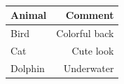\documentclass[11pt, a4paper]{article}
\begin{document}
\begin{example}
\begin{gridlayout}{\textwidth}{11cm}
\begin{row}{0.3}
\begin{cell}{0.3}
            \end{cell}
            \begin{cell}{0.05}
                ~
            \end{cell}
            \begin{cell}{0.3}
                \centering
                \vspace{1em}
                \begin{tabular}{lr}
                    \toprule
                    Animal & Comment \\
                    \midrule
                    Bird & Colorful back \\
                    Cat & Cute look \\
                    Dolphin & Underwater \\
                    \bottomrule
                \end{tabular}
            \end{cell}
        \end{row}
    \end{gridlayout}
\end{example}



\end{document}
